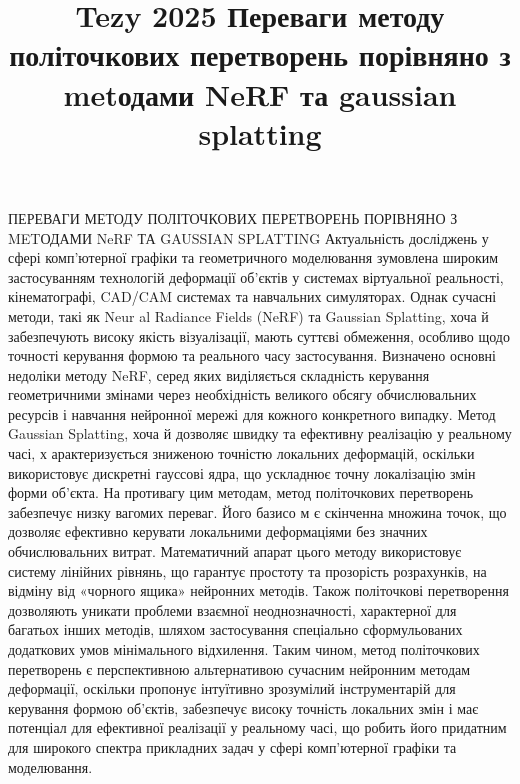 \documentclass[12pt,a4paper]{article}
\begin{document}
\title{Tezy 2025 Переваги методу політочкових перетворень порівняно з metодами NeRF та gaussian splatting}
\maketitle
ПЕРЕВАГИ МЕТОДУ ПОЛІТОЧКОВИХ ПЕРЕТВОРЕНЬ ПОРІВНЯНО З METОДАМИ NeRF ТА GAUSSIAN SPLATTING Актуальність досліджень у сфері комп’ютерної графіки та геометричного моделювання зумовлена широким застосуванням технологій деформації об’єктів у системах віртуальної реальності, кінематографі, CAD/CAM системах та навчальних симуляторах. Однак сучасні методи, такі як Neur al Radiance Fields (NeRF) та Gaussian Splatting, хоча й забезпечують високу якість візуалізації, мають суттєві обмеження, особливо щодо точності керування формою та реального часу застосування. Визначено основні недоліки методу NeRF, серед яких виділяється складність керування геометричними змінами через необхідність великого обсягу обчислювальних ресурсів і навчання нейронної мережі для кожного конкретного випадку. Метод Gaussian Splatting, хоча й дозволяє швидку та ефективну реалізацію у реальному часі, х арактеризується зниженою точністю локальних деформацій, оскільки використовує дискретні гауссові ядра, що ускладнює точну локалізацію змін форми об'єкта. На противагу цим методам, метод політочкових перетворень забезпечує низку вагомих переваг. Його базисо м є скінченна множина точок, що дозволяє ефективно керувати локальними деформаціями без значних обчислювальних витрат. Математичний апарат цього методу використовує систему лінійних рівнянь, що гарантує простоту та прозорість розрахунків, на відміну від «чорного ящика» нейронних методів. Також політочкові перетворення дозволяють уникати проблеми взаємної неоднозначності, характерної для багатьох інших методів, шляхом застосування спеціально сформульованих додаткових умов мінімального відхилення. Таким чином, метод політочкових перетворень є перспективною альтернативою сучасним нейронним методам деформації, оскільки пропонує інтуїтивно зрозумілий інструментарій для керування формою об’єктів, забезпечує високу точність локальних змін і має потенціал для ефективної реалізації у реальному часі, що робить його придатним для широкого спектра прикладних задач у сфері комп’ютерної графіки та моделювання.
\par
\end{document}
